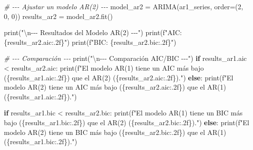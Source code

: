 \documentclass[
  11pt,
]{article}
\newenvironment{Shaded}{}{}
\newcommand{\BuiltInTok}[1]{\textcolor[rgb]{0.00,0.50,0.00}{#1}}
\newcommand{\CharTok}[1]{\textcolor[rgb]{0.25,0.44,0.63}{#1}}
\newcommand{\CommentTok}[1]{\textcolor[rgb]{0.38,0.63,0.69}{\textit{#1}}}
\newcommand{\ControlFlowTok}[1]{\textcolor[rgb]{0.00,0.44,0.13}{\textbf{#1}}}
\newcommand{\DecValTok}[1]{\textcolor[rgb]{0.25,0.63,0.44}{#1}}
\newcommand{\NormalTok}[1]{#1}
\newcommand{\OperatorTok}[1]{\textcolor[rgb]{0.40,0.40,0.40}{#1}}
\newcommand{\SpecialCharTok}[1]{\textcolor[rgb]{0.25,0.44,0.63}{#1}}
\newcommand{\SpecialStringTok}[1]{\textcolor[rgb]{0.73,0.40,0.53}{#1}}
\newcommand{\StringTok}[1]{\textcolor[rgb]{0.25,0.44,0.63}{#1}}
\begin{document}
\begin{Shaded}
\begin{Highlighting}[]
\CommentTok{\# {-}{-}{-} Ajustar un modelo AR(2) {-}{-}{-}}
\NormalTok{model\_ar2 }\OperatorTok{=}\NormalTok{ ARIMA(ar1\_series, order}\OperatorTok{=}\NormalTok{(}\DecValTok{2}\NormalTok{, }\DecValTok{0}\NormalTok{, }\DecValTok{0}\NormalTok{))}
\NormalTok{results\_ar2 }\OperatorTok{=}\NormalTok{ model\_ar2.fit()}

\BuiltInTok{print}\NormalTok{(}\StringTok{"}\CharTok{\textbackslash{}n}\StringTok{{-}{-}{-} Resultados del Modelo AR(2) {-}{-}{-}"}\NormalTok{)}
\BuiltInTok{print}\NormalTok{(}\SpecialStringTok{f"AIC: }\SpecialCharTok{\{}\NormalTok{results\_ar2}\SpecialCharTok{.}\NormalTok{aic}\SpecialCharTok{:.2f\}}\SpecialStringTok{"}\NormalTok{)}
\BuiltInTok{print}\NormalTok{(}\SpecialStringTok{f"BIC: }\SpecialCharTok{\{}\NormalTok{results\_ar2}\SpecialCharTok{.}\NormalTok{bic}\SpecialCharTok{:.2f\}}\SpecialStringTok{"}\NormalTok{)}


\CommentTok{\# {-}{-}{-} Comparación {-}{-}{-}}
\BuiltInTok{print}\NormalTok{(}\StringTok{"}\CharTok{\textbackslash{}n}\StringTok{{-}{-}{-} Comparación AIC/BIC {-}{-}{-}"}\NormalTok{)}
\ControlFlowTok{if}\NormalTok{ results\_ar1.aic }\OperatorTok{\textless{}}\NormalTok{ results\_ar2.aic:}
    \BuiltInTok{print}\NormalTok{(}\SpecialStringTok{f"El modelo AR(1) tiene un AIC más bajo (}\SpecialCharTok{\{}\NormalTok{results\_ar1}\SpecialCharTok{.}\NormalTok{aic}\SpecialCharTok{:.2f\}}\SpecialStringTok{) que el AR(2) (}\SpecialCharTok{\{}\NormalTok{results\_ar2}\SpecialCharTok{.}\NormalTok{aic}\SpecialCharTok{:.2f\}}\SpecialStringTok{)."}\NormalTok{)}
\ControlFlowTok{else}\NormalTok{:}
    \BuiltInTok{print}\NormalTok{(}\SpecialStringTok{f"El modelo AR(2) tiene un AIC más bajo (}\SpecialCharTok{\{}\NormalTok{results\_ar2}\SpecialCharTok{.}\NormalTok{aic}\SpecialCharTok{:.2f\}}\SpecialStringTok{) que el AR(1) (}\SpecialCharTok{\{}\NormalTok{results\_ar1}\SpecialCharTok{.}\NormalTok{aic}\SpecialCharTok{:.2f\}}\SpecialStringTok{)."}\NormalTok{)}

\ControlFlowTok{if}\NormalTok{ results\_ar1.bic }\OperatorTok{\textless{}}\NormalTok{ results\_ar2.bic:}
    \BuiltInTok{print}\NormalTok{(}\SpecialStringTok{f"El modelo AR(1) tiene un BIC más bajo (}\SpecialCharTok{\{}\NormalTok{results\_ar1}\SpecialCharTok{.}\NormalTok{bic}\SpecialCharTok{:.2f\}}\SpecialStringTok{) que el AR(2) (}\SpecialCharTok{\{}\NormalTok{results\_ar2}\SpecialCharTok{.}\NormalTok{bic}\SpecialCharTok{:.2f\}}\SpecialStringTok{)."}\NormalTok{)}
\ControlFlowTok{else}\NormalTok{:}
    \BuiltInTok{print}\NormalTok{(}\SpecialStringTok{f"El modelo AR(2) tiene un BIC más bajo (}\SpecialCharTok{\{}\NormalTok{results\_ar2}\SpecialCharTok{.}\NormalTok{bic}\SpecialCharTok{:.2f\}}\SpecialStringTok{) que el AR(1) (}\SpecialCharTok{\{}\NormalTok{results\_ar1}\SpecialCharTok{.}\NormalTok{bic}\SpecialCharTok{:.2f\}}\SpecialStringTok{)."}\NormalTok{)}
\end{Highlighting}
\end{Shaded}
\end{document}
